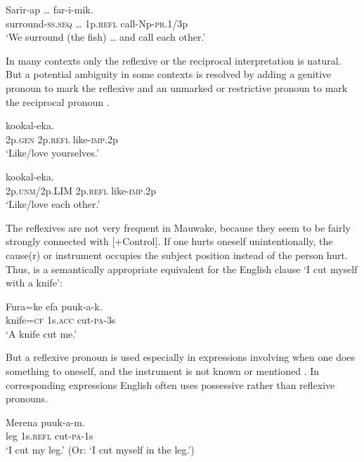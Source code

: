 \ea%
\label{ex:3:x1866}
\gll Sarir-ap {\dots }  far-i-mik. \\
surround-\textsc{ss}.\textsc{seq} {\dots} 1p.\textsc{refl} call-Np-\textsc{pr}.1/3p\\
\glt`We surround (the fish) {\dots} and call each other.'
\z

In many contexts only the reflexive or the reciprocal interpretation is natural. But a potential ambiguity in some contexts is resolved by adding a genitive pronoun to mark the reflexive  and an unmarked or restrictive pronoun to mark the reciprocal pronoun .

\ea%
\label{ex:3:x614}
\gll {}  kookal-eka. \\
2p.\textsc{gen} 2p.\textsc{refl} like-\textsc{imp}.2p\\
\glt`Like/love yourselves.'
\z

\ea%
\label{ex:3:x613}
\gll {}  kookal-eka. \\
2p.\textsc{unm}/2p.LIM 2p.\textsc{refl} like-\textsc{imp}.2p\\
\glt`Like/love each other.'
\z

The reflexives are not very frequent in Mauwake, because they seem to be fairly strongly connected with [+Control]. If one hurts oneself unintentionally, the cause(r) or instrument occupies the subject position instead of the person hurt. Thus,  is a semantically appropriate equivalent for the English clause `I cut myself with a knife':

\ea%
\label{ex:3:x617}
\gll Fura=ke efa puuk-a-k. \\
knife=\textsc{cf} 1s.\textsc{acc} cut-\textsc{pa}-3s\\
\glt`A knife cut me.'
\z

But a reflexive pronoun is used especially in expressions involving  when one does something to oneself, and the instrument is not known or mentioned . In corresponding expressions English often uses possessive rather than reflexive pronouns.

\ea%
\label{ex:3:x618}
\gll Merena  puuk-a-m. \\
leg 1s.\textsc{refl} cut-\textsc{pa}-1s\\
\glt`I cut my leg.' (Or: `I cut myself in the leg.')
\z

